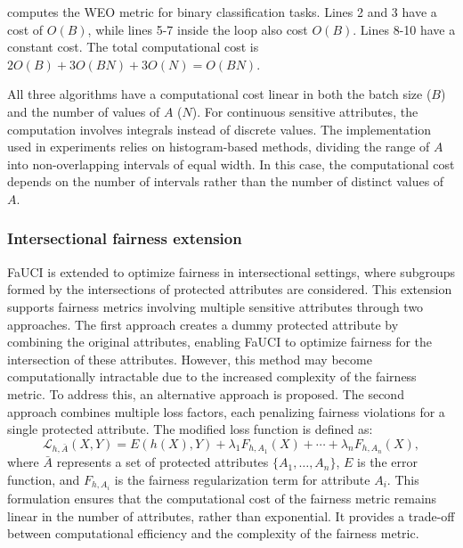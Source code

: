 %
 computes the \gls{WEO} metric for binary classification tasks.
%
Lines 2 and 3 have a cost of \(O(B)\), while lines 5-7 inside the loop also cost \(O(B)\).
%
Lines 8-10 have a constant cost.
%
The total computational cost is \(2O(B) + 3O(BN) + 3O(N) = O(BN)\).

%
All three algorithms have a computational cost linear in both the batch size (\(B\)) and the number of values of \(A\) (\(N\)).
%
For continuous sensitive attributes, the computation involves integrals instead of discrete values.
%
The implementation used in experiments relies on histogram-based methods, dividing the range of \(A\) into non-overlapping intervals of equal width.
%
In this case, the computational cost depends on the number of intervals rather than the number of distinct values of \(A\).



\subsubsection{Intersectional fairness extension}\label{subsubsec:intersectional-fairness}
%
\Gls{FaUCI} is extended to optimize fairness in intersectional settings, where subgroups formed by the intersections of protected attributes are considered.
%
This extension supports fairness metrics involving multiple sensitive attributes through two approaches.
%
The first approach creates a dummy protected attribute by combining the original attributes, enabling \gls{FaUCI} to optimize fairness for the intersection of these attributes.
%
However, this method may become computationally intractable due to the increased complexity of the fairness metric.
%
To address this, an alternative approach is proposed.
%
The second approach combines multiple loss factors, each penalizing fairness violations for a single protected attribute.
%
The modified loss function is defined as:
%
\begin{equation}
    \label{eq:intersectional_loss}
    \mathcal{L}_{h,\bar{A}}(X, Y) = E(h(X), Y) + \lambda_1 F_{h,A_1}(X) + \cdots + \lambda_n F_{h,A_n}(X),
\end{equation}
%
where \(\bar{A}\) represents a set of protected attributes \(\{A_1, \ldots, A_n\}\), \(E\) is the error function, and \(F_{h,A_i}\) is the fairness regularization term for attribute \(A_i\).
%
This formulation ensures that the computational cost of the fairness metric remains linear in the number of attributes, rather than exponential.
%
It provides a trade-off between computational efficiency and the complexity of the fairness metric.
%


